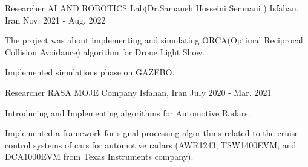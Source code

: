 

\begin{cventries}



  \cventry
    {Researcher} %
    {AI AND ROBOTICS Lab(Dr.‪Samaneh Hosseini Semnani )} %
    {Isfahan, Iran} %
    {Nov. 2021 - Aug. 2022} %
    {
      \begin{cvitems} %
        \item {The project was about implementing and simulating ORCA(Optimal Reciprocal Collision Avoidance) algorithm for Drone Light Show.}
        \item {Implemented simulations phase on GAZEBO.}
      \end{cvitems}
    }
  \cventry
    {Researcher} %
    {RASA MOJE Company} %
    {Isfahan, Iran} %
    {July 2020 - Mar. 2021} %
    {
      \begin{cvitems} %
        \item {Introducing and Implementing algorithms for Automotive Radars.}
        \item {Implemented a framework for signal processing algorithms related to the cruise control 
        systems of cars for automotive radars (AWR1243, TSW1400EVM, and DCA1000EVM from Texas Instruments company).}
      \end{cvitems}
    }
 
\end{cventries}

